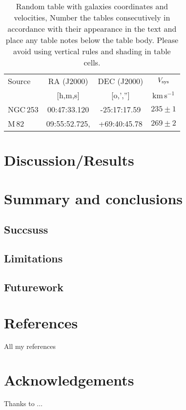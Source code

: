 \documentclass[final,5p,times,twocolumn,authoryear]{elsarticle}
\newcommand{\kms}{km\,s$^{-1}$}
\begin{document}
\begin{table}
\begin{tabular}{l c c c} 
 \hline
 Source & RA (J2000) & DEC (J2000) & $V_{\rm sys}$ \\ 
        & [h,m,s]    & [o,','']    & \kms          \\
 \hline
 NGC\,253 & 	00:47:33.120 & -25:17:17.59 & $235 \pm 1$ \\ 
 M\,82 & 09:55:52.725, & +69:40:45.78 & $269 \pm 2$ 	 \\ 
 \hline
\end{tabular}
\caption{Random table with galaxies coordinates and velocities, Number the tables consecutively in
accordance with their appearance in the text and place any table notes below the table body. Please avoid using vertical rules and shading in table cells.
}
\label{Table1}
\end{table}


\section{Discussion/Results}
\lipsum[4]

\section{Summary and conclusions}
\subsection{Succsuss}
\subsection{Limitations}
\subsection{Futurework}

\section{References}
All my references

\section*{Acknowledgements}
Thanks to ...

\appendix
\end{document}
